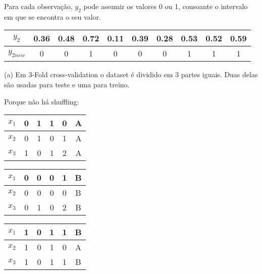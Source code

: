 \documentclass[a4paper,12pt]{article} %
\begin{document}
\begin{enumerate}
Para cada observação, $y_2$ pode assumir os valores 0 ou 1, consoante o intervalo em que se encontra o seu valor. \\

\begin{table}[H]
    \centering
    \begin{tabular}{c|ccccccccc}
    $y_2$     & 0.36 & 0.48 & 0.72 & 0.11 & 0.39 & 0.28 & 0.53 & 0.52 & 0.59 \\ \hline
    $y_{2 new}$ & 0    & 0    & 1    & 0    & 0    & 0    & 1    & 1    & 1   
    \end{tabular}
\end{table}

(a)
Em 3-Fold cross-validation o dataset é dividido em 3 partes iguais. Duas delas são usadas para teste e uma para treino.

Porque não há shuffling:

\begin{table}[H]
    \begin{minipage}[b]{0.3\linewidth}
    \centering
    \begin{tabular}{cccccc}
        $x_1$ & 0 & 1 & 1 & 0 & A \\ \hline
        $x_2$ & 0 & 1 & 0 & 1 & A \\ \hline
        $x_3$ & 1 & 0 & 1 & 2 & A
        \end{tabular}
    \end{minipage}
    \hfill
    \begin{minipage}[b]{0.3\linewidth}
    \centering
    \begin{tabular}{cccccc}
        $x_1$ & 0 & 0 & 0 & 1 & B \\ \hline
        $x_2$ & 0 & 0 & 0 & 0 & B \\ \hline
        $x_3$ & 0 & 1 & 0 & 2 & B
        \end{tabular}
    \end{minipage}
    \hfill
    \begin{minipage}[b]{0.3\linewidth}
    \centering
    \begin{tabular}{cccccc}
        $x_1$ & 1 & 0 & 1 & 1 & B \\ \hline
        $x_2$ & 1 & 0 & 1 & 0 & A \\ \hline
        $x_3$ & 1 & 0 & 1 & 1 & B
        \end{tabular}
    \end{minipage}
    \hfill


\end{table}
\end{enumerate}
\end{document}
